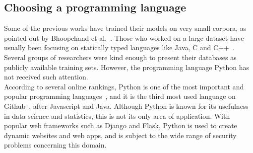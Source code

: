 \documentclass[
a4paper,
pagesize,
pdftex,
12pt,
ngerman,
fleqn,
final,
]{scrartcl}
\begin{document}
	\subsection{Choosing a programming language}
	Some of the previous works have trained their models on very small corpora, as pointed out by Bhoopchand et al.~\cite{Bhoopchand.2016}. Those who worked on a large dataset have usually been focusing on statically typed languages like Java, C and C++~\cite{Bellon.2007,Russell.2018,Liu.2018,Dam.2017, Rolim.2018}. Several groups of researchers were kind enough to present their databases as publicly available training sets. However, the programming language Python has not received such attention. \\
	According to several online rankings, Python is one of the most important and popular programming languages~\cite{AyeshaCuthbert.15.4.2019, VidushiDwivedi.}, and it is the third most used language on Github~\cite{Github.com.19}, after Javascript and Java. Although Python is known for its usefulness in data science and statistics, this is not its only area of application. With popular web frameworks such as Django and Flask, Python is used to create dynamic websites and web apps, and is subject to the wide range of security problems concerning this domain.\\
	
\end{document}
